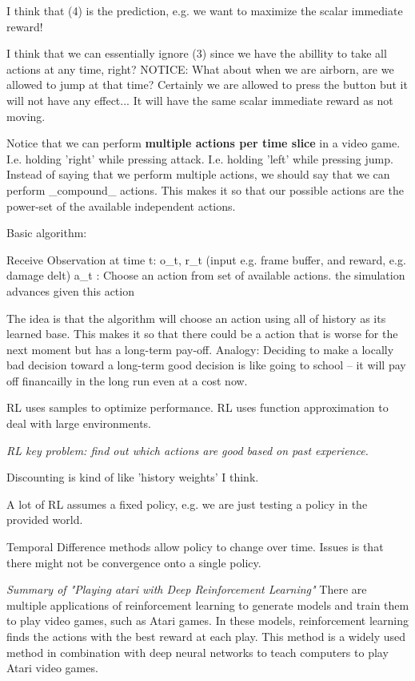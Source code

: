 I think that (4) is the prediction, e.g. we want to maximize the scalar immediate reward!

I think that we can essentially ignore (3) since we have the abillity to take all actions at any time, right?
NOTICE: What about when we are airborn, are we allowed to jump at that time?
Certainly we are allowed to press the button but it will not have any effect... It will have the same scalar immediate reward as not moving.

Notice that we can perform \textbf{multiple actions per time slice} in a video game.
I.e. holding 'right' while pressing attack.
I.e. holding 'left' while pressing jump.
Instead of saying that we perform multiple actions, we should say that we can perform _compound_ actions. 
This makes it so that our possible actions are the power-set of the available independent actions.

Basic algorithm:
  \begin{listlisting}
Receive Observation at time t:
  o_t, r_t (input e.g. frame buffer, and reward, e.g. damage delt)
  a_t : Choose an action from set of available actions.
  the simulation advances given this action
  \end{listlisting}

The idea is that the algorithm will choose an action using all of history as its learned base.
This makes it so that there could be a action that is worse for the next moment but has a long-term pay-off.
Analogy: Deciding to make a locally bad decision toward a long-term good decision is like going to school -- it will pay off financailly in the long run even at a cost now.

RL uses samples to optimize performance.
RL uses function approximation to deal with large environments.

\textit{RL key problem: find out which actions are good based on past experience.}

Discounting is kind of like 'history weights' I think.

A lot of RL assumes a fixed policy, e.g. we are just testing a policy in the provided world.

Temporal Difference methods allow policy to change over time.
  Issues is that there might not be convergence onto a single policy.
 

  \textit{Summary of "Playing atari with Deep Reinforcement Learning"}
There are multiple applications of reinforcement learning to generate models and train them to play video games, such as Atari games. 
In these models, reinforcement learning finds the actions with the best reward at each play. 
This method is a widely used method in combination with deep neural networks to teach computers to play Atari video games.

